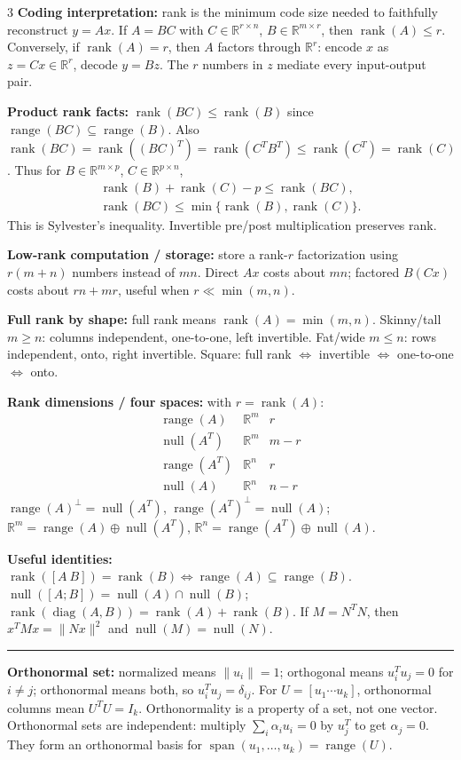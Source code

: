 \documentclass[10pt]{article}
\newcommand{\sect}[1]{\vspace{0.9pt}{\fontsize{7.2}{7.5}\selectfont\textbf{#1}}\vspace{0.25pt}\hrule\vspace{0.8pt}}
\newcommand{\sub}[1]{\textbf{#1}}
\newcommand{\R}{\mathbb{R}}
\newcommand{\rank}{\operatorname{rank}}
\newcommand{\range}{\operatorname{range}}
\newcommand{\nullsp}{\operatorname{null}}
\begin{document}
\begin{multicols*}{3}
\sub{Coding interpretation:} rank is the minimum code size needed to
faithfully reconstruct \(y=Ax\). If \(A=BC\) with
\(C\in\R^{r\times n}\), \(B\in\R^{m\times r}\), then
\(\rank(A)\le r\). Conversely, if \(\rank(A)=r\), then \(A\) factors
through \(\R^r\): encode \(x\) as \(z=Cx\in\R^r\), decode \(y=Bz\).
The \(r\) numbers in \(z\) mediate every input-output pair.

\sub{Product rank facts:} \(\rank(BC)\le\rank(B)\) since
\(\range(BC)\subseteq\range(B)\). Also
\(\rank(BC)=\rank((BC)^T)=\rank(C^TB^T)\le\rank(C^T)=\rank(C)\). Thus
for \(B\in\R^{m\times p}\), \(C\in\R^{p\times n}\),
\[
\begin{gathered}
\rank(B)+\rank(C)-p\le\rank(BC),\\
\rank(BC)\le\min\{\rank(B),\rank(C)\}.
\end{gathered}
\]
This is Sylvester's inequality. Invertible pre/post multiplication
preserves rank.

\sub{Low-rank computation / storage:} store a rank-\(r\) factorization
using \(r(m+n)\) numbers instead of \(mn\). Direct \(Ax\) costs about
\(mn\); factored \(B(Cx)\) costs about \(rn+mr\), useful when
\(r\ll\min(m,n)\).

\sub{Full rank by shape:} full rank means \(\rank(A)=\min(m,n)\).
Skinny/tall \(m\ge n\): columns independent, one-to-one, left invertible.
Fat/wide \(m\le n\): rows independent, onto, right invertible. Square:
full rank \(\Leftrightarrow\) invertible \(\Leftrightarrow\) one-to-one
\(\Leftrightarrow\) onto.

\sub{Rank dimensions / four spaces:} with \(r=\rank(A)\):
\[
\begin{array}{c|c|c}
\range(A)&\R^m&r\\ \nullsp(A^T)&\R^m&m-r\\
\range(A^T)&\R^n&r\\ \nullsp(A)&\R^n&n-r
\end{array}
\]
\(\range(A)^\perp=\nullsp(A^T)\), \(\range(A^T)^\perp=\nullsp(A)\);
\(\R^m=\range(A)\oplus\nullsp(A^T)\), \(\R^n=\range(A^T)\oplus\nullsp(A)\).

\sub{Useful identities:}
\(\rank([A\ B])=\rank(B)\iff\range(A)\subseteq\range(B)\).
\(\nullsp([A;B])=\nullsp(A)\cap\nullsp(B)\);
\(\rank(\operatorname{diag}(A,B))=\rank(A)+\rank(B)\). If
\(M=N^TN\), then \(x^TMx=\|Nx\|^2\) and \(\nullsp(M)=\nullsp(N)\).

\sect{Orthogonality}
\sub{Orthonormal set:} normalized means \(\|u_i\|=1\); orthogonal means
\(u_i^Tu_j=0\) for \(i\ne j\); orthonormal means both, so
\(u_i^Tu_j=\delta_{ij}\). For \(U=[u_1\cdots u_k]\), orthonormal columns
mean \(U^TU=I_k\). Orthonormality is a property of a set, not one vector.
Orthonormal sets are independent: multiply \(\sum_i\alpha_iu_i=0\) by
\(u_j^T\) to get \(\alpha_j=0\). They form an orthonormal basis for
\(\operatorname{span}(u_1,\ldots,u_k)=\range(U)\).


\end{multicols*}
\end{document}
